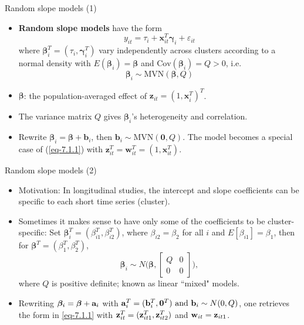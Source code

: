 \documentclass{beamer}
\newcommand{\boldbeta}{{\boldsymbol \beta}}
\newcommand{\boldgamma}{{\boldsymbol \gamma}}
\newenvironment{wideitemize}%
  {\begin{itemize}%
    \setlength{\parskip}{1em}}%
  {\end{itemize}}
\begin{document}
\begin{frame}{Random slope models (1)}
\begin{wideitemize}
\item {\bf Random slope models} have the form 
$$y_{it}=\tau_i + \mathbf{x}_{it}^T\boldgamma_i +\varepsilon_{it}$$
where $\boldbeta_i^T=(\tau_i, \boldgamma_i^T)$ vary independently
across clusters according to a normal density with $E(\boldbeta_i)=\boldbeta$
and $\mbox{Cov}(\boldbeta_i)=Q>0$, i.e. 
\[
\boldbeta_i \sim \text{MVN}(\boldbeta, Q)
\]


\item
$\boldbeta$: the population-averaged effect of $\mathbf{z}_{it}=(1, \mathbf{x}_i^T)^T$.

\item 
The variance matrix $Q$ gives $\boldbeta_i$'s heterogeneity and correlation.
\item
Rewrite $\boldbeta_i=\boldbeta+\mathbf{b}_i$, then $\mathbf{b}_i\sim 
\text{MVN}(\mathbf{0}, Q)$. The model becomes a special case of (\ref{eq-7.1.1}) with $\mathbf{z}_{it}^T
=\mathbf{w}_{it}^T=(1, \mathbf{x}_{it}^T)$.
\end{wideitemize} 
\end{frame}





\begin{frame}{Random slope models (2)}
\begin{wideitemize}
\item
Motivation: In longitudinal studies, the intercept and slope coefficients can be
specific to each short time series (cluster).
\item Sometimes it makes sense to have only some of the coefficients to be cluster-specific:  Set $\boldsymbol \beta_i^T = (\beta_{i1}^T, \beta_{i2}^T)$, where $ \beta_{i2} = \beta_2$ for all $i$ and $E[ \beta_{i1}] = \beta_1$, then for $\boldbeta^T  =  (\beta_1^T, \beta_2^T)$,
\[
\boldsymbol \beta_i  \sim N\bigg(\boldbeta , 
\left[\begin{matrix}
  Q& 0 \\
  0 & 0
 \end{matrix}\right]\bigg),
\]
where $Q$ is positive definite; known as linear ``mixed" models.

\item Rewriting $\boldbeta_i = \boldbeta + {\bf a}_i$ with 
$
{\bf a}_i^T = ({\bf b}_i^T, {\bf 0}^T) \text{ and } {\bf b}_i \sim N(0, Q)
$,
one retrieves the form in \eqref{eq-7.1.1} with ${\bf z}_{it}^T = ({\bf z}_{it1}^T, {\bf z}_{it2}^T)$ and ${\bf w}_{it} = {\bf z}_{it1}$.


\end{wideitemize}


\end{frame}
\end{document}

